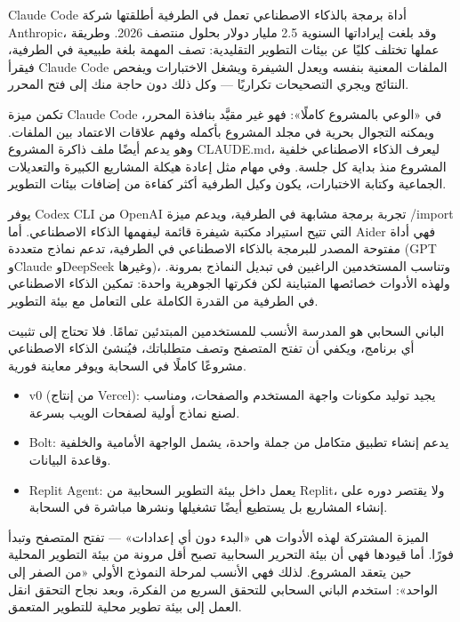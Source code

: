 
Claude Code أداة برمجة بالذكاء الاصطناعي تعمل في الطرفية أطلقتها شركة Anthropic، وقد بلغت إيراداتها السنوية 2.5 مليار دولار بحلول منتصف 2026. وطريقة عملها تختلف كليًا عن بيئات التطوير التقليدية: تصف المهمة بلغة طبيعية في الطرفية، فيقرأ Claude Code الملفات المعنية بنفسه ويعدل الشيفرة ويشغل الاختبارات ويفحص النتائج ويجري التصحيحات تكراريًا — وكل ذلك دون حاجة منك إلى فتح المحرر.

تكمن ميزة Claude Code في «الوعي بالمشروع كاملًا»: فهو غير مقيَّد بنافذة المحرر، ويمكنه التجوال بحرية في مجلد المشروع بأكمله وفهم علاقات الاعتماد بين الملفات. وهو يدعم أيضًا ملف ذاكرة المشروع CLAUDE.md، ليعرف الذكاء الاصطناعي خلفية المشروع منذ بداية كل جلسة. وفي مهام مثل إعادة هيكلة المشاريع الكبيرة والتعديلات الجماعية وكتابة الاختبارات، يكون وكيل الطرفية أكثر كفاءة من إضافات بيئات التطوير.


يوفر Codex CLI من OpenAI تجربة برمجة مشابهة في الطرفية، ويدعم ميزة /import التي تتيح استيراد مكتبة شيفرة قائمة ليفهمها الذكاء الاصطناعي. أما Aider فهي أداة مفتوحة المصدر للبرمجة بالذكاء الاصطناعي في الطرفية، تدعم نماذج متعددة (GPT وClaude وDeepSeek وغيرها)، وتناسب المستخدمين الراغبين في تبديل النماذج بمرونة. ولهذه الأدوات خصائصها المتباينة لكن فكرتها الجوهرية واحدة: تمكين الذكاء الاصطناعي في الطرفية من القدرة الكاملة على التعامل مع بيئة التطوير.


الباني السحابي هو المدرسة الأنسب للمستخدمين المبتدئين تمامًا. فلا تحتاج إلى تثبيت أي برنامج، ويكفي أن تفتح المتصفح وتصف متطلباتك، فيُنشئ الذكاء الاصطناعي مشروعًا كاملًا في السحابة ويوفر معاينة فورية.

\begin{itemize}
  \item v0 (من إنتاج Vercel): يجيد توليد مكونات واجهة المستخدم والصفحات، ومناسب لصنع نماذج أولية لصفحات الويب بسرعة.
  \item Bolt: يدعم إنشاء تطبيق متكامل من جملة واحدة، يشمل الواجهة الأمامية والخلفية وقاعدة البيانات.
  \item Replit Agent: يعمل داخل بيئة التطوير السحابية من Replit، ولا يقتصر دوره على إنشاء المشاريع بل يستطيع أيضًا تشغيلها ونشرها مباشرة في السحابة.
\end{itemize}

الميزة المشتركة لهذه الأدوات هي «البدء دون أي إعدادات» — تفتح المتصفح وتبدأ فورًا. أما قيودها فهي أن بيئة التحرير السحابية تصبح أقل مرونة من بيئة التطوير المحلية حين يتعقد المشروع. لذلك فهي الأنسب لمرحلة النموذج الأولي «من الصفر إلى الواحد»: استخدم الباني السحابي للتحقق السريع من الفكرة، وبعد نجاح التحقق انقل العمل إلى بيئة تطوير محلية للتطوير المتعمق.

